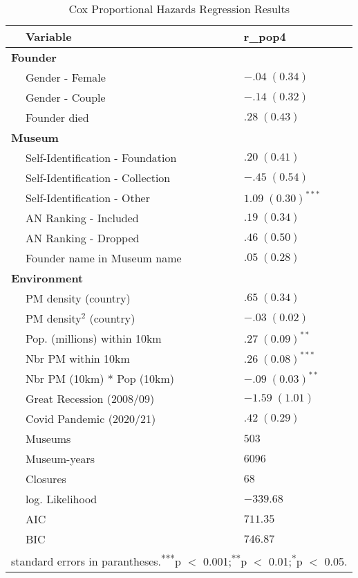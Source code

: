 \documentclass[12pt]{article}
\begin{document}
\begin{table}[ht]
\centering
\begin{tabular}{p{0mm}ll}
  \hline 
 \multicolumn{1}{l}{} & \multicolumn{1}{l}{Variable} & \multicolumn{1}{l}{r\_pop4}\\ 
 \hline
  \multicolumn{3}{l}{\textbf{Founder}} \\ 
 & Gender - Female & $-.04 \; (0.34)$ \\ 
   & Gender - Couple & $-.14 \; (0.32)$ \\ 
   & Founder died & $.28 \; (0.43)$ \\ 
   \multicolumn{3}{l}{\textbf{Museum}} \\ 
 & Self-Identification - Foundation & $.20 \; (0.41)$ \\ 
   & Self-Identification - Collection & $-.45 \; (0.54)$ \\ 
   & Self-Identification - Other & $1.09 \; (0.30)^{***}$ \\ 
   & AN Ranking - Included & $.19 \; (0.34)$ \\ 
   & AN Ranking - Dropped & $.46 \; (0.50)$ \\ 
   & Founder name in Museum name & $.05 \; (0.28)$ \\ 
   \multicolumn{3}{l}{\textbf{Environment}} \\ 
 & PM density (country) & $.65 \; (0.34)$ \\ 
   & PM density$^{2}$ (country) & $-.03 \; (0.02)$ \\ 
   & Pop. (millions) within 10km & $.27 \; (0.09)^{**}$ \\ 
   & Nbr PM within 10km & $.26 \; (0.08)^{***}$ \\ 
   & Nbr PM (10km) * Pop (10km) & $-.09 \; (0.03)^{**}$ \\ 
   & Great Recession (2008/09) & $-1.59 \; (1.01)$ \\ 
   & Covid Pandemic (2020/21) & $.42 \; (0.29)$ \\ 
   \hline
 & Museums & $503$ \\ 
   & Museum-years & $6096$ \\ 
   & Closures & $68$ \\ 
   & log. Likelihood & $-339.68$ \\ 
   & AIC & $711.35$ \\ 
   & BIC & $746.87$ \\ 
   \hline 
 \multicolumn{3}{l}{\footnotesize{standard errors in parantheses.\textsuperscript{***}p $<$ 0.001;\textsuperscript{**}p $<$ 0.01;\textsuperscript{*}p $<$ 0.05.}} \\ 
\end{tabular}
\caption{Cox Proportional Hazards Regression Results} 
\label{tbl:t_reg_coxph}
\end{table}
\end{document}
